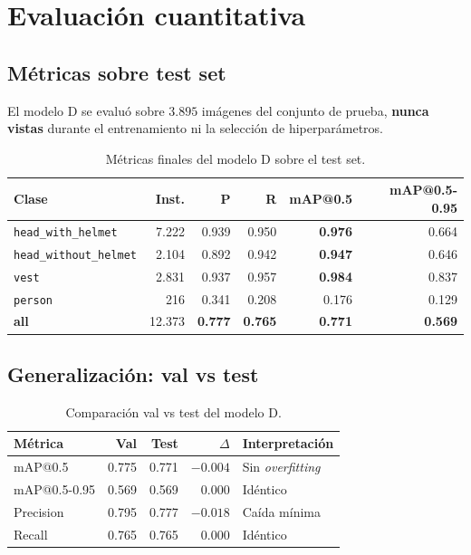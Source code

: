\documentclass[journal,onecolumn,11pt]{IEEEtran}
\begin{document}
\section{Evaluación cuantitativa}

\subsection{Métricas sobre test set}

El modelo D se evaluó sobre $3.895$ imágenes del conjunto de prueba,
\textbf{nunca vistas} durante el entrenamiento ni la selección de
hiperparámetros.

\begin{table}[H]
\centering
\caption{Métricas finales del modelo D sobre el test set.}
\label{tab:test_final}
\begin{tabular}{l r r r r r}
\toprule
\textbf{Clase} & \textbf{Inst.} & \textbf{P} & \textbf{R}
& \textbf{mAP@0.5} & \textbf{mAP@0.5-0.95} \\
\midrule
\texttt{head\_with\_helmet} & 7.222 & 0.939 & 0.950 & \textbf{0.976} & 0.664 \\
\texttt{head\_without\_helmet} & 2.104 & 0.892 & 0.942 & \textbf{0.947} & 0.646 \\
\texttt{vest} & 2.831 & 0.937 & 0.957 & \textbf{0.984} & 0.837 \\
\texttt{person} & 216 & 0.341 & 0.208 & 0.176 & 0.129 \\
\midrule
\textbf{all} & 12.373 & \textbf{0.777} & \textbf{0.765} & \textbf{0.771} & \textbf{0.569} \\
\bottomrule
\end{tabular}
\end{table}

\subsection{Generalización: val vs test}

\begin{table}[H]
\centering
\caption{Comparación val vs test del modelo D.}
\begin{tabular}{l r r r l}
\toprule
\textbf{Métrica} & \textbf{Val} & \textbf{Test} & \textbf{$\Delta$}
& \textbf{Interpretación} \\
\midrule
mAP@0.5 & 0.775 & 0.771 & $-0.004$ & Sin \textit{overfitting} \\
mAP@0.5-0.95 & 0.569 & 0.569 & $0.000$ & Idéntico \\
Precision & 0.795 & 0.777 & $-0.018$ & Caída mínima \\
Recall & 0.765 & 0.765 & $0.000$ & Idéntico \\
\bottomrule
\end{tabular}
\end{table}
\end{document}
